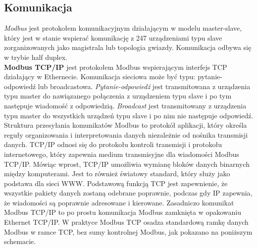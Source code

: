 \documentclass[12pt]{article}
\begin{document}
\subsection{Komunikacja}
\textit{Modbus} jest protokołem komunikacyjnym działającym w modelu master-slave, który jest w stanie wspierać komunikację z 247 urządzeniami typu slave zorganizowanych  jako magistrala lub topologia gwiazdy. Komunikacja odbywa się w trybie half duplex.\\
\textbf{Modbus TCP/IP} jest protokołem Modbus wspierającym interfejs TCP działający w Ethernecie. Komunikacja sieciowa może być typu: pytanie-odpowiedź lub broadcastowa. \textit{Pytanie-odpowiedź} jest transmitowana z urządzenia typu master do nawiązanego połączenia z urządzeniem typu slave i po tym następuje wiadomość z odpowiedzią. \textit{Broadcast} jest transmitowany z urządzenia typu master do wszystkich urządzeń typu slave i po nim nie następuje odpowiedź.
Struktura przesyłania komunikatów Modbus to protokół aplikacji, który określa reguły organizowania i interpretowania danych niezależnie od nośnika transmisji danych. TCP/IP odnosi się do protokołu kontroli transmisji i protokołu internetowego, który zapewnia medium transmisyjne dla wiadomości Modbus TCP/IP. Mówiąc wprost, TCP/IP umożliwia wymianę bloków danych binarnych między komputerami. Jest to również światowy standard, który służy jako podstawa dla sieci WWW. Podstawową funkcją TCP jest zapewnienie, że wszystkie pakiety danych zostaną odebrane poprawnie, podczas gdy IP zapewnia, że wiadomości są poprawnie adresowane i kierowane. Zasadniczo komunikat Modbus TCP/IP to
po prostu komunikacja Modbus zamknięta w opakowaniu Ethernet TCP/IP.
W praktyce Modbus TCP osadza standardową ramkę danych Modbus w ramce TCP,
bez sumy kontrolnej Modbus, jak pokazano na poniższym schemacie.
\end{document}
